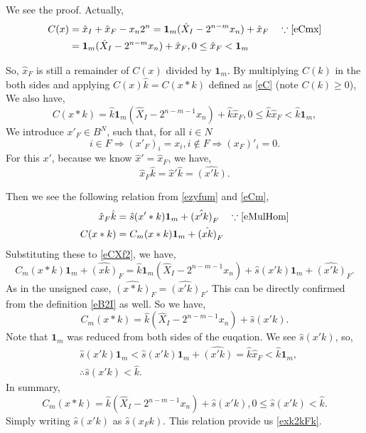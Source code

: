 \documentclass[a4paper]{article}
\newcommand{\eqlabel}[1]{\label{#1}
}
\newcommand{\br}[1]{\left(#1\right)}
\newcommand{\hx}{{\hat{x}}}
\newcommand{\hk}{{\hat{k}}}
\newcommand{\hs}{{\hat{s}}}
\newcommand{\hX}{{\hat{X}}}
\newcommand{\fum}{{\mathbf{1}_m}}
\begin{document}
We see the proof. Actually, 
\begin{align}
    \nonumber
C(x) &= \hx_I + \hx_F - x_n 2^n = \fum (\hX_I - 2^{n-m}x_n) + \hx_F
\eqlabel{e9}\quad \because \eqref{eCmx}\\
&= \fum (\hX_I - 2^{n-m}x_n) + \hx_F, 0\leq \hx_F < \fum 
\end{align}

So, \(\hx_F\) is still a remainder of \(C(x)\) divided by \(\fum\). By multiplying \(C(k)\) in the both sides and applying \(C(x)\hk = C(x*k)\) defined as \eqref{eC} (note \(C(k) \geq 0\)), We also have, 
\begin{equation}
    \eqlabel{eCXf2}
C(x*k) = \hk\fum (\hX_I - 2^{n-m-1}x_n) + \hk\hx_F, 0\leq \hk\hx_F < \hk\fum,
\end{equation}
We introduce \(x'_F\in B^N\), such that, for all \(i\in N\)
\[
	i\in F \Rightarrow (x'_F)_i = x_i, i\not\in F \Rightarrow (x_F)'_i = 0.
\]
For this \(x'\), because we know \(\hx' = \hx_F\), we have,
\[
	\hx_F \hk = \hx' \hk = \hat{(x' k)}.
\]

Then we see the following relation from \eqref{ezyfum} and \eqref{eCm}, 
\begin{align}
    \eqlabel{ezyfum2}
\hx_F \hk  &=  \hs(x' * k)\fum + \hat{(x' k)}_F\quad\because \eqref{eMulHom}\\
    \eqlabel{ezyfum3}
C(x*k) &=  C_m(x*k) \fum + \hat{(x k)}_F
\end{align}
Substituting these to \eqref{eCXf2}, we have,
\[
 C_m(x*k)\fum + \hat{(x k)}_F = \hk\fum (\hX_I - 2^{n-m-1}x_n) + \hs(x' k)\fum + \hat{(x' k)}_F.
\]
As in the unsigned case, \(\hat{(x*k)}_F = \hat{(x' k)}_F\). This can be directly confirmed from the definition \eqref{eB2I} as well. So we have,
\[ 
  C_m(x*k) = \hk (\hX_I - 2^{n-m-1}x_n) + \hs(x' k).
\]
Note that \(\fum\) was reduced from both sides of the euqation. We see \(\hs(x' k)\), so,
\begin{align*}
& \hs(x' k)\fum < \hs(x' k)\fum + \hat{(x' k)} = \hk\hx_F < \hk \fum,\\
&\therefore \hs(x' k) < \hk.
\end{align*}
In summary, 
\[
  C_m(x*k) = \hk (\hX_I - 2^{n-m-1}x_n) + \hs(x' k), 0\leq \hs(x' k) < \hk.
\]
Simply writing \(\hs\br{x' k}\) as \(\hs\br{x_F k}\). This relation provide us \eqref{exk2kFk}.
\end{document}
